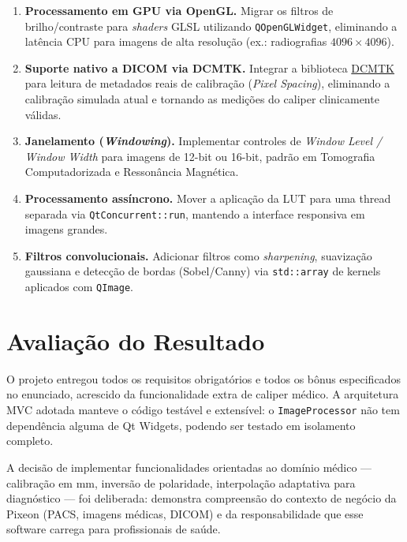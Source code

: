 \documentclass[12pt, a4paper]{article}
\begin{document}
\begin{enumerate}
  \item \textbf{Processamento em GPU via OpenGL.} Migrar os filtros de
        brilho/contraste para \textit{shaders} GLSL utilizando
        \texttt{QOpenGLWidget}, eliminando a latência CPU para imagens de
        alta resolução (ex.: radiografias $4096 \times 4096$).

  \item \textbf{Suporte nativo a DICOM via DCMTK.} Integrar a biblioteca
        \href{https://dicom.offis.de/dcmtk}{DCMTK} para leitura de metadados
        reais de calibração (\textit{Pixel Spacing}), eliminando a calibração
        simulada atual e tornando as medições do caliper clinicamente válidas.

  \item \textbf{Janelamento (\textit{Windowing}).} Implementar controles de
        \textit{Window Level / Window Width} para imagens de 12-bit ou 16-bit,
        padrão em Tomografia Computadorizada e Ressonância Magnética.

  \item \textbf{Processamento assíncrono.} Mover a aplicação da LUT para uma
        thread separada via \texttt{QtConcurrent::run}, mantendo a interface
        responsiva em imagens grandes.

  \item \textbf{Filtros convolucionais.} Adicionar filtros como
        \textit{sharpening}, suavização gaussiana e detecção de bordas
        (Sobel/Canny) via \texttt{std::array} de kernels aplicados com
        \texttt{QImage}.
\end{enumerate}

\section{Avaliação do Resultado}

O projeto entregou todos os requisitos obrigatórios e todos os bônus
especificados no enunciado, acrescido da funcionalidade extra de caliper
médico. A arquitetura MVC adotada manteve o código testável e extensível: o
\texttt{ImageProcessor} não tem dependência alguma de Qt Widgets, podendo ser
testado em isolamento completo.

A decisão de implementar funcionalidades orientadas ao domínio médico ---
calibração em mm, inversão de polaridade, interpolação adaptativa para
diagnóstico --- foi deliberada: demonstra compreensão do contexto de negócio
da Pixeon (PACS, imagens médicas, DICOM) e da responsabilidade que esse
software carrega para profissionais de saúde.
\end{document}
